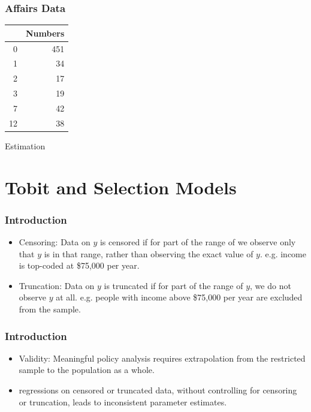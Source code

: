 \documentclass{beamer}
\newcommand{\1}{\mathbb{1}}
\begin{document}
\begin{frame}\frametitle{Affairs Data}
\begin{table}[ht]
\centering
\begin{tabular}{rr}
  \hline
 & Numbers \\ 
  \hline
0 & 451 \\ 
  1 &  34 \\ 
  2 &  17 \\ 
  3 &  19 \\ 
  7 &  42 \\ 
  12 &  38 \\ 
   \hline
\end{tabular}
\end{table}
\end{frame}

\begin{frame}{Estimation}

\end{frame}

\section{Tobit and Selection Models}

\begin{frame}
\tableofcontents[currentsection] 
\end{frame}

\begin{frame}\frametitle{Introduction}
\begin{itemize}
\item Censoring: Data on $y$ is censored if for part of the range of  we observe only that $y$ is in that range, rather than observing the exact value of $y$. e.g. income is top-coded at \$75,000 per year.
\item Truncation: Data on $y$ is truncated if for part of the range of $y$, we do not observe $y$ at all.
e.g. people with income above \$75,000 per year are
excluded from the sample.
\end{itemize}
\end{frame}

\begin{frame}\frametitle{Introduction}
\begin{itemize}
 \item Validity: Meaningful policy analysis requires extrapolation from
the restricted sample to the population as a whole.
\item regressions on censored or truncated data,
without controlling for censoring or truncation, leads to inconsistent parameter estimates.
\end{itemize}
\end{frame}
\end{document}

